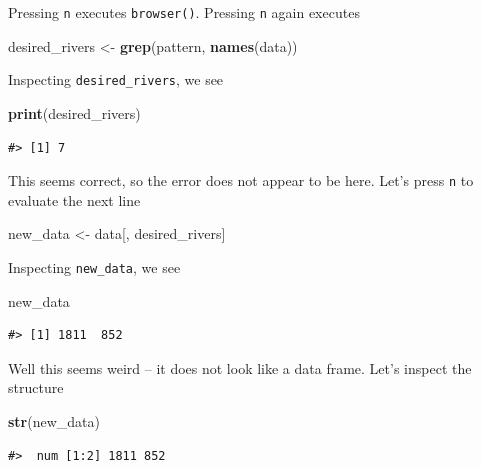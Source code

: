 \documentclass[
]{book}
\newenvironment{Shaded}{\begin{snugshade}}{\end{snugshade}}
\newcommand{\KeywordTok}[1]{\textcolor[rgb]{0.13,0.29,0.53}{\textbf{#1}}}
\newcommand{\NormalTok}[1]{#1}
\newcommand{\StringTok}[1]{\textcolor[rgb]{0.31,0.60,0.02}{#1}}
\begin{document}
Pressing \texttt{n} executes \texttt{browser()}. Pressing \texttt{n} again executes

\begin{Shaded}
\begin{Highlighting}[]
\NormalTok{desired_rivers <-}\StringTok{ }\KeywordTok{grep}\NormalTok{(pattern, }\KeywordTok{names}\NormalTok{(data))}
\end{Highlighting}
\end{Shaded}

Inspecting \texttt{desired\_rivers}, we see

\begin{Shaded}
\begin{Highlighting}[]
\KeywordTok{print}\NormalTok{(desired_rivers)}
\end{Highlighting}
\end{Shaded}

\begin{verbatim}
#> [1] 7
\end{verbatim}

This seems correct, so the error does not appear to be here. Let's press \texttt{n} to evaluate the next line

\begin{Shaded}
\begin{Highlighting}[]
\NormalTok{new_data <-}\StringTok{ }\NormalTok{data[, desired_rivers]}
\end{Highlighting}
\end{Shaded}

Inspecting \texttt{new\_data}, we see

\begin{Shaded}
\begin{Highlighting}[]
\NormalTok{new_data}
\end{Highlighting}
\end{Shaded}

\begin{verbatim}
#> [1] 1811  852
\end{verbatim}

Well this seems weird -- it does not look like a data frame. Let's inspect the structure

\begin{Shaded}
\begin{Highlighting}[]
\KeywordTok{str}\NormalTok{(new_data)}
\end{Highlighting}
\end{Shaded}

\begin{verbatim}
#>  num [1:2] 1811 852
\end{verbatim}
\end{document}
